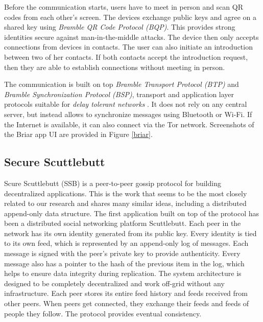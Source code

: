 Before the communication starts, users have to meet in person and scan QR codes from each other's screen. The devices exchange public keys and agree on a shared key using \textit{Bramble QR Code Protocol (BQP)}.
This provides strong identities secure against man-in-the-middle attacks.
The device then only accepts connections from devices in contacts. The user can also initiate an introduction between two of her contacts. If both contacts accept the introduction request, then they are able to establish connections without meeting in person.

The communication is built on top \textit{Bramble Transport Protocol (BTP)} and \textit{Bramble Synchronization Protocol (BSP)}, transport and application layer protocols suitable for \textit{delay tolerant networks} \cite{briar_stack}. It does not rely on any central server, but instead allows to synchronize messages using Bluetooth or Wi-Fi. If the Internet is available, it can also connect via the Tor network. Screenshots of the Briar app UI are provided in Figure \ref{briar}.


\subsection{Secure Scuttlebutt}

Scure Scuttlebutt (SSB) \cite{ssb} is a peer-to-peer gossip protocol for building decentralized applications. This is the work that seems to be the most closely related to our research and shares many similar ideas, including a distributed append-only data structure. The first application built on top of the protocol has been a distributed social networking platform Scuttlebutt. Each peer in the network has its own identity generated from its public key. Every identity is tied to its own feed, which is represented by an append-only log of messages. Each message is signed with the peer's private key to provide authenticity. Every message also has a pointer to the hash of the previous item in the log, which helps to ensure data integrity during replication.
The system architecture is designed to be completely decentralized and work off-grid without any infrastructure. Each peer stores its entire feed history and feeds received from other peers. When peers get connected, they exchange their feeds and feeds of people they follow. The protocol provides eventual consistency.

